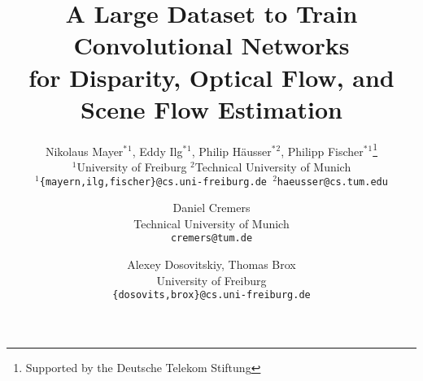 \documentclass[10pt,twocolumn,letterpaper]{article}
\begin{document}
\title{A Large Dataset to Train Convolutional Networks\\[1mm] for Disparity, Optical Flow, and Scene Flow Estimation}

\renewcommand*{\thefootnote}{\fnsymbol{footnote}}

\author{
  Nikolaus Mayer$^*$$^1$,
  Eddy Ilg$^*$$^1$,
  Philip H{\"a}usser$^*$$^2$,
  Philipp Fischer$^*$$^1$\footnote{Supported by the Deutsche Telekom Stiftung}\\
  $^1$University of Freiburg \hspace*{1cm} $^2$Technical University of Munich\\
  {\tt\small $^1$\{mayern,ilg,fischer\}@cs.uni-freiburg.de \hspace{.5cm} $^2$haeusser@cs.tum.edu}
\and
  Daniel Cremers\\
  Technical University of Munich\\
  {\tt\small cremers@tum.de}
\and
  Alexey Dosovitskiy, 
  Thomas Brox\\
  University of Freiburg\\
  {\tt\small \{dosovits,brox\}@cs.uni-freiburg.de}
}


\maketitle



\renewcommand*{\thefootnote}{\arabic{footnote}}
\end{document}
